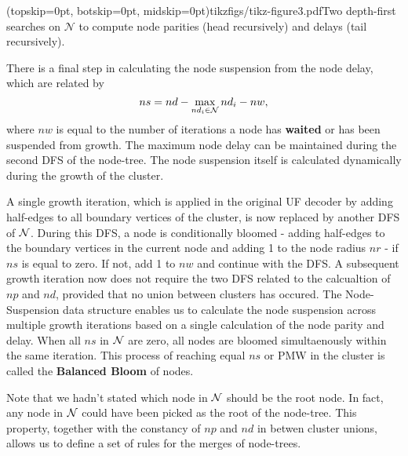\Figure[htb](topskip=0pt, botskip=0pt, midskip=0pt){tikzfigs/tikz-figure3.pdf}{Two depth-first searches on $\mathcal{N}$ to compute node parities (head recursively) and delays (tail recursively).\label{fig3}}

There is a final step in calculating the node suspension from the node delay, which are related by
\begin{equation}\label{eq:suspension}
    ns = nd - \max_{nd_i \in \nset} nd_i - nw, 
\end{equation}
where $nw$ is equal to the number of iterations a node has \textbf{waited} or has been suspended from growth. The maximum node delay can be maintained during the second DFS of the node-tree. The node suspension itself is calculated dynamically during the growth of the cluster. 

A single growth iteration, which is applied in the original UF decoder by adding half-edges to all boundary vertices of the cluster, is now replaced by another DFS of $\mathcal{N}$. During this DFS, a node is conditionally bloomed - adding half-edges to the boundary vertices in the current node and adding 1 to the node radius $nr$ - if $ns$ is equal to zero. If not, add 1 to $nw$ and continue with the DFS. A subsequent growth iteration now does not require the two DFS related to the calcualtion of $np$ and $nd$, provided that no union between clusters has occured. The Node-Suspension data structure enables us to calculate the node suspension across multiple growth iterations based on a single calculation of the node parity and delay. When all $ns$ in $\mathcal{N}$ are zero, all nodes are bloomed simultaenously within the same iteration. This process of reaching equal $ns$ or PMW in the cluster is called the \textbf{Balanced Bloom} of nodes. 

Note that we hadn't stated which node in $\mathcal{N}$ should be the root node. In fact, any node in $\mathcal{N}$ could have been picked as the root of the node-tree. This property, together with the constancy of $np$ and $nd$ in betwen cluster unions, allows us to define a set of rules for the merges of node-trees.  